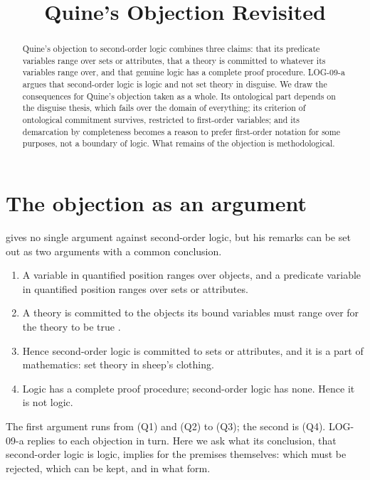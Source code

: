 \documentclass{situationist-preprint}
\title{Quine's Objection Revisited}
\begin{document}
\maketitle

\begin{abstract}
Quine's objection to second-order logic combines three claims: that its predicate variables range over sets or attributes, that a theory is committed to whatever its variables range over, and that genuine logic has a complete proof procedure. LOG-09-a argues that second-order logic is logic and not set theory in disguise. We draw the consequences for Quine's objection taken as a whole. Its ontological part depends on the disguise thesis, which fails over the domain of everything; its criterion of ontological commitment survives, restricted to first-order variables; and its demarcation by completeness becomes a reason to prefer first-order notation for some purposes, not a boundary of logic. What remains of the objection is methodological.
\end{abstract}

\section{The objection as an argument}

\citet{Quine1970} gives no single argument against second-order logic, but his remarks can be set out as two arguments with a common conclusion.
\begin{enumerate}[label=(Q\arabic*)]
\item A variable in quantified position ranges over objects, and a predicate variable in quantified position ranges over sets or attributes.
\item A theory is committed to the objects its bound variables must range over for the theory to be true \citep{Quine1948}.
\item Hence second-order logic is committed to sets or attributes, and it is a part of mathematics: set theory in sheep's clothing.
\item Logic has a complete proof procedure; second-order logic has none. Hence it is not logic.
\end{enumerate}
The first argument runs from (Q1) and (Q2) to (Q3); the second is (Q4). LOG-09-a replies to each objection in turn. Here we ask what its conclusion, that second-order logic is logic, implies for the premises themselves: which must be rejected, which can be kept, and in what form.
\end{document}
